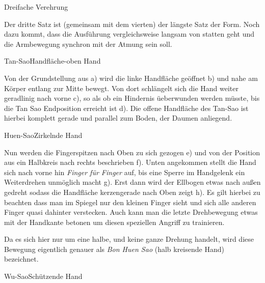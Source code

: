 \begin{WTSatz}{Dreifache Verehrung}%
	
	
	Der dritte Satz ist (gemeinsam mit dem vierten) der l\"angste Satz der Form. Noch dazu kommt, dass die Ausf\"uhrung vergleichsweise langsam von statten geht und die Armbewegung synchron mit der Atmung sein soll.
	
	\begin{WTSatzTeil}{Tan-Sao}{Handfl\"ache-oben Hand}
		
		Von der Grundstellung aus a) wird die linke Handfl\"ache ge\"offnet b) und nahe am K\"orper entlang zur Mitte bewegt. Von dort schl\"angelt sich die Hand weiter geradlinig nach vorne c), so als ob ein Hindernis \"ueberwunden werden m\"usste, bis die Tan Sao Endposition erreicht ist d). Die offene Handfl\"ache des Tan-Sao ist hierbei komplett gerade und parallel zum Boden, der Daumen anliegend.
		
	\end{WTSatzTeil}
	\begin{WTSatzTeil}{Huen-Sao}{Zirkelnde Hand}
		
		Nun werden die Fingerspitzen nach Oben zu sich gezogen e) und von der Position aus ein Halbkreis nach rechts beschrieben f). Unten angekommen stellt die Hand sich nach vorne hin \textit{Finger f\"ur Finger} auf, bis eine Sperre im Handgelenk ein Weiterdrehen unm\"oglich macht g). Erst dann wird der Ellbogen etwas nach au{\ss}en gedreht sodass die Handfl\"ache kerzengerade nach Oben zeigt h). Es gilt hierbei zu beachten dass man im Spiegel nur den kleinen Finger sieht und sich alle anderen Finger quasi dahinter verstecken. Auch kann man die letzte Drehbewegung etwas mit der Handkante betonen um diesen speziellen Angriff zu trainieren.
		
		\begin{WTCommonBegriff}
			Da es sich hier nur um eine halbe, und keine ganze Drehung handelt, wird diese Bewegung eigentlich genauer als \textit{Bon Huen Sao} (halb kreisende Hand) bezeichnet.
		\end{WTCommonBegriff}

	\end{WTSatzTeil}
	\begin{WTSatzTeil}{Wu-Sao}{Sch\"utzende Hand}
		

\end{WTSatzTeil}
\end{WTSatz}
